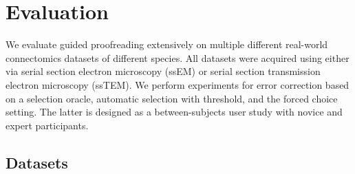 
\section{Evaluation}
\label{sec:evaluation}

We evaluate guided proofreading extensively on multiple different real-world connectomics datasets of different species. All datasets were acquired using either via serial section electron microscopy (ssEM) or serial section transmission electron microscopy (ssTEM). We perform experiments for error correction based on a selection oracle, automatic selection with threshold, and the forced choice setting. The latter is designed as a between-subjects user study with novice and expert participants.

\subsection{Datasets}

